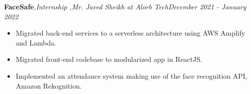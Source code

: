\textbf{FaceSafe}\sep{\it Internship \sep Mr. Javed Sheikh at Alorb Tech}\hfill {\sl \small December 2021 - January 2022}\\
\vspace{-5pt}
\begin{itemize}[itemsep = -1.3 mm, leftmargin=*]
\item Migrated back-end services to a serverless architecture using AWS Amplify and Lambda.
\item Migrated front-end codebase to modularized app in ReactJS.
\item Implemented an attendance system making use of the face recognition API, Amazon Rekognition.
\end{itemize}